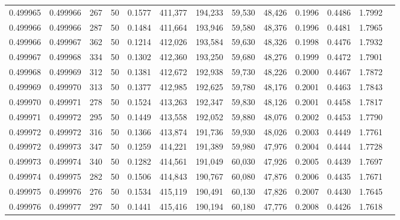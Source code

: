 \begin{tabular}{rrrrrrrrrrrrr}
0.499965 & 0.499966 & 267 &  50 &                                     0.1577 & 411,377 & 194,233 &  59,530 &  48,426 & 0.1996 & 0.4486 & 1.7992 \\
0.499966 & 0.499966 & 287 &  50 &                                     0.1484 & 411,664 & 193,946 &  59,580 &  48,376 & 0.1996 & 0.4481 & 1.7965 \\
0.499966 & 0.499967 & 362 &  50 &                                     0.1214 & 412,026 & 193,584 &  59,630 &  48,326 & 0.1998 & 0.4476 & 1.7932 \\
0.499967 & 0.499968 & 334 &  50 &                                     0.1302 & 412,360 & 193,250 &  59,680 &  48,276 & 0.1999 & 0.4472 & 1.7901 \\
0.499968 & 0.499969 & 312 &  50 &                                     0.1381 & 412,672 & 192,938 &  59,730 &  48,226 & 0.2000 & 0.4467 & 1.7872 \\
0.499969 & 0.499970 & 313 &  50 &                                     0.1377 & 412,985 & 192,625 &  59,780 &  48,176 & 0.2001 & 0.4463 & 1.7843 \\
0.499970 & 0.499971 & 278 &  50 &                                     0.1524 & 413,263 & 192,347 &  59,830 &  48,126 & 0.2001 & 0.4458 & 1.7817 \\
0.499971 & 0.499972 & 295 &  50 &                                     0.1449 & 413,558 & 192,052 &  59,880 &  48,076 & 0.2002 & 0.4453 & 1.7790 \\
0.499972 & 0.499972 & 316 &  50 &                                     0.1366 & 413,874 & 191,736 &  59,930 &  48,026 & 0.2003 & 0.4449 & 1.7761 \\
0.499972 & 0.499973 & 347 &  50 &                                     0.1259 & 414,221 & 191,389 &  59,980 &  47,976 & 0.2004 & 0.4444 & 1.7728 \\
0.499973 & 0.499974 & 340 &  50 &                                     0.1282 & 414,561 & 191,049 &  60,030 &  47,926 & 0.2005 & 0.4439 & 1.7697 \\
0.499974 & 0.499975 & 282 &  50 &                                     0.1506 & 414,843 & 190,767 &  60,080 &  47,876 & 0.2006 & 0.4435 & 1.7671 \\
0.499975 & 0.499976 & 276 &  50 &                                     0.1534 & 415,119 & 190,491 &  60,130 &  47,826 & 0.2007 & 0.4430 & 1.7645 \\
0.499976 & 0.499977 & 297 &  50 &                                     0.1441 & 415,416 & 190,194 &  60,180 &  47,776 & 0.2008 & 0.4426 & 1.7618 \\

\end{tabular}

